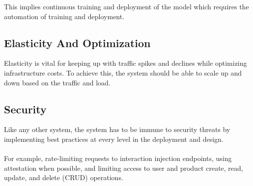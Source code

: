 This implies continuous training and deployment of the model which requires the automation of training and deployment.

\subsection{Elasticity And Optimization}

Elasticity is vital for keeping up with traffic spikes and declines while optimizing infrastructure costs. To achieve this, the system should be able to scale up and down based on the traffic and load.

\subsection{Security}

Like any other system, the system has to be immune to security threats by implementing best practices at every level in the deployment and design. \\ \\
For example, rate-limiting requests to interaction injection endpoints, using attestation when possible, and limiting access to user and product create, read, update, and delete (CRUD) operations.
 